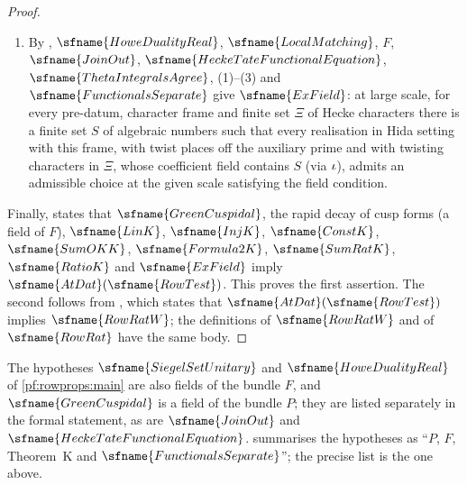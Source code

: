 \begin{proof}
\begin{enumerate}[label=(\arabic*)]
the arrows of the grids carry vector-valued cusp forms of the multiplicity spaces to such cusp forms
($\sfname{LiftsCuspidal}$); by , $F$ and $\sfname{LiftsCuspidal}$ give
$\sfname{LinB}$, the convergence of all pairings $\psi_K$ for choices satisfying the admissibility conditions other than the
real pairing condition; and by , $\sfname{FunctionalsSeparate}$ and
$\sfname{LinB}$ give $\sfname{InjK}$: at large scale, for admissible choices, $\psi_K(a,u)=0$ for all $a$ implies $u=0$.
\item By , $\sfname{HoweDualityReal}$,
$\sfname{LocalMatching}$, $F$, $\sfname{JoinOut}$, $\sfname{HeckeTateFunctionalEquation}$, $\sfname{ThetaIntegralsAgree}$,
(1)--(3) and $\sfname{FunctionalsSeparate}$ give $\sfname{ExField}$: at large scale, for every pre-datum, character
frame and finite set $\Xi$ of Hecke characters there is a finite set $S$ of algebraic numbers such that every realisation
in Hida setting with this frame, with twist places off the auxiliary prime and with twisting characters in $\Xi$, whose
coefficient field contains $S$ (via $\iota$), admits an admissible choice at the given scale satisfying the field
condition.
\end{enumerate}
Finally,  states that $\sfname{GreenCuspidal}$, the rapid decay of
cusp forms (a field of $F$), $\sfname{LinK}$, $\sfname{InjK}$, $\sfname{ConstK}$, $\sfname{SumOKK}$, $\sfname{Formula2K}$,
$\sfname{SumRatK}$, $\sfname{RatioK}$ and $\sfname{ExField}$ imply $\sfname{AtDat}(\sfname{RowTest})$. This proves the
first assertion. The second follows from , which states
that $\sfname{AtDat}(\sfname{RowTest})$ implies $\sfname{RowRatW}$; the definitions of $\sfname{RowRatW}$ and of
$\sfname{RowRat}$ have the same body.
\end{proof}

\begin{remark}\label{pf:rowprops:rem:partI}
The hypotheses $\sfname{SiegelSetUnitary}$ and $\sfname{HoweDualityReal}$ of \cref{pf:rowprops:main} are also fields
of the bundle $F$, and $\sfname{GreenCuspidal}$ is a field of the bundle $P$; they are listed separately in the formal
statement, as are $\sfname{JoinOut}$ and $\sfname{HeckeTateFunctionalEquation}$.  summarises
the hypotheses as ``$P$, $F$, Theorem~K and $\sfname{FunctionalsSeparate}$''; the precise list is the one above.
\end{remark}

